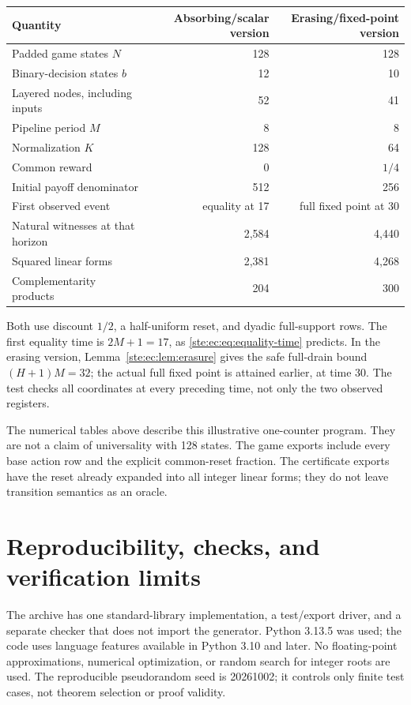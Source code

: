 \documentclass[11pt,letterpaper]{article}
\theoremstyle{definition}
\theoremstyle{remark}
\begin{document}
\begin{center}
\begin{tabular}{lrr}
\toprule
Quantity & Absorbing/scalar version & Erasing/fixed-point version\\
\midrule
Padded game states $N$ & 128 & 128\\
Binary-decision states $b$ & 12 & 10\\
Layered nodes, including inputs & 52 & 41\\
Pipeline period $M$ & 8 & 8\\
Normalization $K$ & 128 & 64\\
Common reward & 0 & $1/4$\\
Initial payoff denominator & 512 & 256\\
First observed event & equality at 17 & full fixed point at 30\\
Natural witnesses at that horizon & 2,584 & 4,440\\
Squared linear forms & 2,381 & 4,268\\
Complementarity products & 204 & 300\\
\bottomrule
\end{tabular}
\end{center}

Both use discount $1/2$, a half-uniform reset, and dyadic full-support rows.
The first equality time is $2M+1=17$, as
\eqref{ste:ec:eq:equality-time} predicts. In the erasing version,
Lemma~\ref{ste:ec:lem:erasure} gives the safe full-drain bound $(H+1)M=32$;
the actual full fixed point is attained earlier, at time 30. The test
checks all coordinates at every preceding time, not only the two observed
registers.

The numerical tables above describe this illustrative one-counter program.
They are not a claim of universality with 128 states. The game exports
include every base action row and the explicit common-reset fraction.
The certificate exports have the reset already expanded into all integer
linear forms; they do not leave transition semantics as an oracle.

\section{Reproducibility, checks, and verification limits}
\label{ste:ec:sec:reproduce}

The archive has one standard-library implementation, a test/export driver,
and a separate checker that does not import the generator. Python 3.13.5
was used; the code uses language features available in Python 3.10 and
later. No floating-point approximations, numerical optimization, or random
search for integer roots are used. The reproducible pseudorandom seed is
20261002; it controls only finite test cases, not theorem selection or
proof validity.
\end{document}
